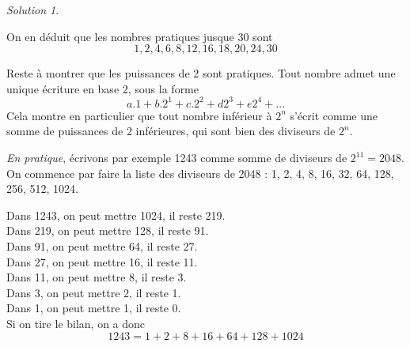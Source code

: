 \documentclass[14pt]{article}
\theoremstyle{remark}
\newtheorem*{sol}{Solution}
\newcounter{n}
\theoremstyle{plain}
\begin{document}
\begin{sol}
\begin{enumerate}
 \end{enumerate}On en déduit que les nombres pratiques jusque $30$ sont \[1, 2, 4, 6, 8,
 12,  16, 18, 20, 24, 30\]
 
 Reste à montrer que les puissances de 2 sont pratiques. Tout nombre admet une unique écriture en base 2, sous la forme 
 \[  a.1 + b.2^1 + c.2^2+ d 2^3+ e 2^4+...\]
 Cela montre en particulier que tout nombre inférieur à $2^n$ s'écrit comme une somme de puissances de $2$ inférieures, qui sont bien des diviseurs de $2^n$. 
 
 \emph{En pratique}, écrivons par exemple 1243 comme somme de diviseurs de $2^{11}=2048$. On commence par faire la liste des diviseurs de 2048 : 1, 2, 4, 8, 16, 32, 64, 128, 256, 512, 1024.
 
 Dans 1243, on peut mettre 1024, il reste 219. \\
 Dans 219, on peut mettre 128, il reste 91.\\
 Dans 91, on peut mettre 64, il reste 27.\\
 Dans 27, on peut mettre 16, il reste 11.\\
 Dans 11, on peut mettre 8, il reste 3. \\
 Dans 3, on peut mettre 2, il reste 1. \\
 Dans 1, on peut mettre 1, il reste 0.\\
 Si on tire le bilan, on a donc 
 \[1243= 1+ 2+ 8+ 16+ 64+ 128+ 1024\]
 
 \end{sol}
\end{document}
